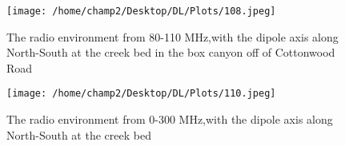 \documentclass[11pt]{article}
\begin{document}
\begin{figure}
    \begin{center}
    \texttt{[image: /home/champ2/Desktop/DL/Plots/108.jpeg]}
    \end{center}
    \caption{
        The radio environment from 80-110 MHz,with the dipole axis along North-South at the creek bed in the box canyon off of Cottonwood Road
    }
    \label{fig:108}
\end{figure}


\begin{figure}
    \begin{center}
    \texttt{[image: /home/champ2/Desktop/DL/Plots/110.jpeg]}
    \end{center}
    \caption{
        The radio environment from 0-300 MHz,with the dipole axis along North-South at the creek bed
    }
    \label{fig:110}
\end{figure}
\end{document}
